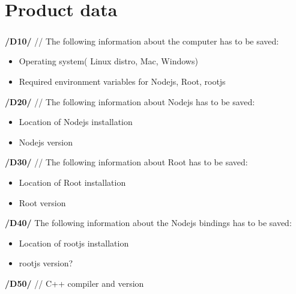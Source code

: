 \chapter{Product data}

\paragraph{}
\textbf{/D10/} //
The following information about the computer has to be saved: 
\begin{itemize}
	\item Operating system( Linux distro, Mac, Windows) 
	\item Required environment variables for Nodejs, Root, rootjs 
\end{itemize}


\textbf{/D20/} //
The following information about Nodejs has to be saved: 
\begin{itemize}
	\item Location of Nodejs installation 
 	\item Nodejs version 
\end{itemize}

\textbf{/D30/} //
The following information about Root has to be saved:
\begin{itemize}
	\item Location of Root installation
	\item Root version
\end{itemize}

\textbf{/D40/}
The following information about the Nodejs bindings has to be saved:
\begin{itemize}
	\item Location of rootjs installation
	\item rootjs version?
\end{itemize}

\textbf{/D50/} //
C++ compiler and version
